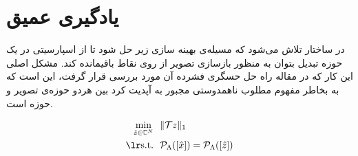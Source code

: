 \section{یادگیری عمیق}\label{ch:literature-review|sec:deep-learning}





\begin{figure}
	\centering
	\hspace{0.1\linewidth}
	\hspace{0.1\linewidth}
	\caption{}
	\label{fig:deep-learning-model}
\end{figure}


در ساختار  تلاش می‌شود که مسيله‌ی بهینه سازی زیر حل شود تا از اسپارسیتی در یک حوزه تبدیل بتوان به منظور بازسازی تصویر از روی نقاط باقیمانده کند. مشکل اصلی این کار که در مقاله \cite{Lustig_2007} راه حل حسگری فشرده آن مورد بررسی قرار گرفت، این است که به بخاطر مفهوم مطلوب ناهمدوستی
مجبور به آپدیت کرد بین هردو حوزه‌ی تصویر و حوزه \kspace است.

\removevspace
\begin{subequations}
	\begin{align}
		\min_{\hat{z}\in\mathbb{C}^N} \ \ &\|\mathcal{T}z\|_1 \\
		\lrtext{s.t.} \ \ & \Rho_\Lambda([\hat{x}]) = \Rho_\Lambda([\hat{z}])
	\end{align}
\end{subequations}


